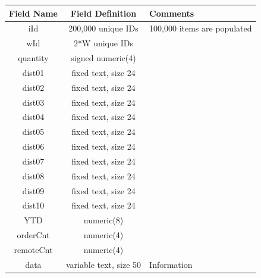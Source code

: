 \begin{center}
\begin{tabular}{ |c|c|m{7cm}| } 
 \hline
 Field Name & Field Definition & Comments \\ 
 \hline
 \rowcolor{gray}
 iId & 200,000 unique IDs  & 100,000 items are populated \\
 \rowcolor{gray}
 wId & 2*W unique IDs & \\
 quantity & signed numeric(4) & \\
 dist01 & fixed text, size 24 & \\
 dist02 & fixed text, size 24 & \\
 dist03 & fixed text, size 24 & \\
 dist04 & fixed text, size 24 & \\
 dist05 & fixed text, size 24 & \\
 dist06 & fixed text, size 24 & \\
 dist07 & fixed text, size 24 & \\
 dist08 & fixed text, size 24 & \\
 dist09 & fixed text, size 24 & \\
 dist10 & fixed text, size 24 & \\
 YTD & numeric(8) & \\
 orderCnt & numeric(4) & \\
 remoteCnt & numeric(4) & \\
 data & variable text, size 50 & Information\\
 \hline
\end{tabular}
\end{center}